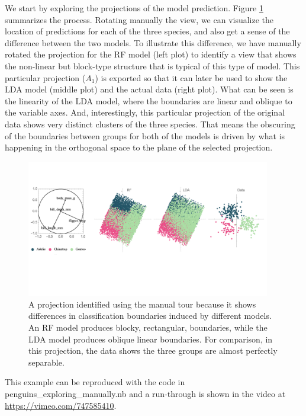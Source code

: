 \documentclass[]{interact}
\theoremstyle{plain}%
\theoremstyle{definition}
\theoremstyle{remark}
\begin{document}
We start by exploring the projections of the model prediction. Figure
\ref{proj1} summarizes the process. Rotating manually the view, we can
visualize the location of predictions for each of the three species, and
also get a sense of the difference between the two models. To illustrate
this difference, we have manually rotated the projection for the RF
model (left plot) to identify a view that shows the non-linear but
block-type structure that is typical of this type of model. This
particular projection (\(A_1\)) is exported so that it can later be used
to show the LDA model (middle plot) and the actual data (right plot).
What can be seen is the linearity of the LDA model, where the boundaries
are linear and oblique to the variable axes. And, interestingly, this
particular projection of the original data shows very distinct clusters
of the three species. That means the obscuring of the boundaries between
groups for both of the models is driven by what is happening in the
orthogonal space to the plane of the selected projection.

\begin{figure}[ht]
\centerline{\includegraphics[width=0.95\textwidth]{figures/proj1.pdf}}
\caption{A projection identified using the manual tour because it shows differences in classification boundaries induced by different models. An RF model produces blocky, rectangular, boundaries, while the LDA model produces oblique linear boundaries. For comparison, in this projection, the data shows the three groups are almost perfectly separable.}
\label{proj1}
\end{figure}

This example can be reproduced with the code in
penguins\_exploring\_manually.nb and a run-through is shown in the video
at \url{https://vimeo.com/747585410}.
\end{document}
